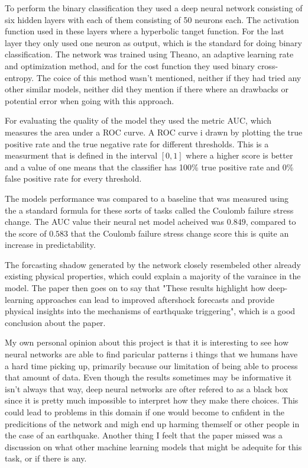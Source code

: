 \documentclass{article}
\begin{document}
To perform the binary classification they used a deep neural network consisting
of six hidden layers with each of them consisting of 50 neurons each. The
activation function used in these layers where a hyperbolic tanget function. For
the last layer they only used one neuron as output, which is the standard for
doing binary classification. The network was trained using Theano, an adaptive
learning rate and optimization method, and for the cost function they used
binary cross-entropy. The coice of this method wasn't mentioned, neither if they
had tried any other similar models, neither did they mention if there where an
drawbacks or potential error when going with this approach.

For evaluating the quality of the model they used the metric AUC, which measures
the area under a ROC curve. A ROC curve i drawn by plotting the true positive
rate and the true negative rate for different thresholds.  
This is a measurment that is defined in the interval
$[0,1]$ where a higher score is better and a value of one means that the
classifier has 100\% true positive rate and 0\% false positive rate for every
threshold. 

The models performance was compared to a baseline that was measured using the
a standard formula for these sorts of tasks called the Coulomb failure stress
change. The AUC value their neural net model acheived was $0.849$, compared to
the score of $0.583$ that the Coulomb failure stress change score this is quite
an increase in predictability. 

The forcasting shadow generated by the network closely resembeled other already
existing physical properties, which could explain a majority of the varaince in
the model. The paper then goes on to say that "These results highlight how
deep-learning approaches can lead to improved aftershock forecasts and provide
physical insights into the mechanisms of earthquake triggering", which is a good
conclusion about the paper. 

My own personal opinion about this project is that it is interesting to see how
neural networks are able to find paricular patterns i things that we humans have
a hard time picking up, primarily because our limitation of being able to
process that amount of data. Even though the results sometimes may be
informative it isn't always that way, deep neural networks are ofter refered to
as a black box since it is pretty much impossible to interpret how they make
there choices. This could lead to problems in this domain if one would become to
cnfident in the predicitions of the network and migh end up harming themself or
other people in the case of an earthquake.  Another thing I feelt that the 
paper missed was a discussion on what other machine learning models that might
be adequite for this task, or if there is any. 
\end{document}
